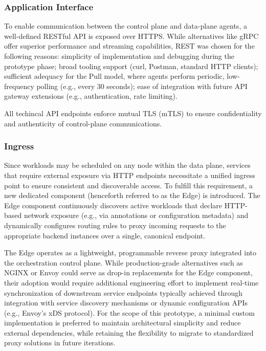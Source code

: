 \subsubsection{Application Interface}
To enable communication between the control plane and data-plane agents, a well-defined RESTful API is exposed over HTTPS. While alternatives like gRPC offer superior performance and streaming capabilities, REST was chosen for the following reasons: simplicity of implementation and debugging during the prototype phase; broad tooling support (curl, Postman, standard HTTP clients); sufficient adequacy for the Pull model, where agents perform periodic, low-frequency polling (e.g., every 30 seconds); ease of integration with future API gateway extensions (e.g., authentication, rate limiting).

All techincal API endpoints enforce mutual TLS (mTLS) to ensure confidentiality and authenticity of control-plane communications.

\subsubsection{Ingress}

Since workloads may be scheduled on any node within the data plane, services that require external exposure via HTTP endpoints necessitate a unified ingress point to ensure consistent and discoverable access. To fulfill this requirement, a new dedicated component (henceforth referred to as the Edge) is introduced. The Edge component continuously discovers active workloads that declare HTTP-based network exposure (e.g., via annotations or configuration metadata) and dynamically configures routing rules to proxy incoming requests to the appropriate backend instances over a single, canonical endpoint.

The Edge operates as a lightweight, programmable reverse proxy integrated into the orchestration control plane. While production-grade alternatives such as NGINX or Envoy could serve as drop-in replacements for the Edge component, their adoption would require additional engineering effort to implement real-time synchronization of downstream service endpoints typically achieved through integration with service discovery mechanisms or dynamic configuration APIs (e.g., Envoy’s xDS protocol). For the scope of this prototype, a minimal custom implementation is preferred to maintain architectural simplicity and reduce external dependencies, while retaining the flexibility to migrate to standardized proxy solutions in future iterations.

